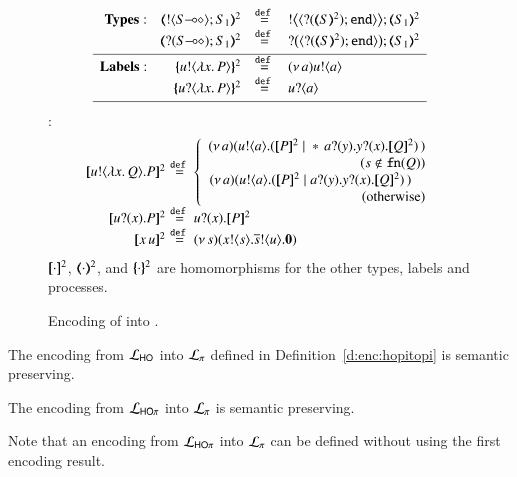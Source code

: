 \begin{figure}[t]
\[
\begin{array}{l}
	\begin{array}{rcl}
\noindent{\bf Types:}\quad 
		\tmap{\btout{\lhot{S}}S_1}{2} & \defeq & \bbtout{\chtype{\btinp{\tmap{S}{2}}\tinact}}\tmap{S_1}{2} \\
		\tmap{\btinp{\lhot{S}}S_1}{2} & \defeq & \bbtinp{\chtype{\btinp{\tmap{S}{2}}\tinact}}\tmap{S_1}{2} 
\\[1mm]
\hline
\noindent{\bf Labels:}\quad \quad 
		\mapa{\bactout{u}{\abs{ x}{P}} }^2  & \defeq & \news{a} \bactout{u}{a} \\
		\mapa{\bactinp{u}{\abs{ x}{P}} }^2 &  \defeq & \bactinp{u}{a}
\\[1mm]
\hline
\end{array}
\end{array}
\]
\hspace{4mm}{\bf Terms} :
\[
\begin{array}{rcll}
		\pmap{\bout{u}{\abs{x}{Q}} P}{2} &\!\!\!\! \defeq \!\!\!\!&  \left\{
		\begin{array}{r}
			\newsp{a}{\bout{u}{a} (\pmap{P}{2} \Par \repl{} \binp{a}{y} \binp{y}{x} \pmap{Q}{2})\,}\\
                  (s \notin \fn{Q}) \\
			\newsp{a}{\bout{u}{a} (\pmap{P}{2} \Par \binp{a}{y} \binp{y}{x} \pmap{Q}{2})\,}\quad\\
            \textrm{(otherwise)} %
		\end{array}
		\right.
		\\
\pmap{\binp{u}{x} P}{2} &\!\!\!\! \defeq \!\!\!\! &  \binp{u}{x} \pmap{P}{2}\\
\pmap{\appl{x}{u}}{2} & \!\!\!\! \defeq \!\!\!\! & \newsp{s}{\bout{x}{s} \bout{\dual{s}}{u} \inact}\\

	\end{array}
	\]
$[\!\![\cdot]\!\!]^2$,
$(\!\!\langle\cdot\rangle\!\!)^2$, 
and 
$\{\!\!\{\cdot\}\!\!\}^2$
are homomorphisms for the other types, labels and processes.   
	\caption{
Encoding of \HO into \sessp.
\label{f:enc:ho_to_sessp}
}
\end{figure}

\begin{theorem}
\label{f:enc:hotopi}
The encoding from $\mathcal{L}_{\mathsf{HO}}$ into $\mathcal{L}_{\pi}$ defined in 
Definition~\ref{d:enc:hopitopi} 
is semantic preserving. 
\end{theorem}

\begin{corollary}
The encoding from $\mathcal{L}_{\mathsf{HO}\pi}$ into $\mathcal{L}_{\pi}$ is semantic preserving. 
\end{corollary}

Note that an encoding from $\mathcal{L}_{\mathsf{HO}\pi}$ into $\mathcal{L}_{\pi}$
can be defined without using the first encoding result.  




